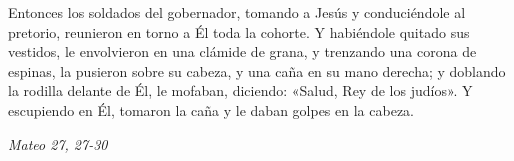 \documentclass[../../devocionario.tex]{subfiles}
\begin{document}
    Entonces los soldados del gobernador, tomando a Jesús y conduciéndole al pretorio, 
    reunieron en torno a Él toda la cohorte. Y habiéndole quitado sus vestidos, le envolvieron en una clámide de grana, 
    y trenzando una corona de espinas, la pusieron sobre su cabeza, y una caña en su mano derecha; 
    y doblando la rodilla delante de Él, le mofaban, diciendo: «Salud, Rey de los judíos». 
    Y escupiendo en Él, tomaron la caña y le daban golpes en la cabeza.

    \begin{flushright}
        \emph{Mateo 27, 27-30}
    \end{flushright}
\end{document}
